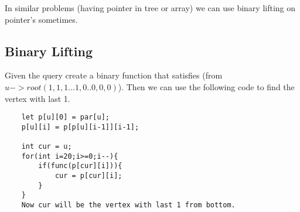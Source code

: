 \documentclass[../Notes.tex]{subfiles}
\begin{document}
In similar problems (having pointer in tree or array) we can use binary lifting on pointer's sometimes.\\

\pagebreak

\subsection{Binary Lifting}
Given the query create a binary function that satisfies (from $u -> root (1,1,1...1,0..0,0,0)$). Then we can use the following code to find the vertex with last 1.

\begin{lstlisting}
	let p[u][0] = par[u];
	p[u][i] = p[p[u][i-1]][i-1];
	
	int cur = u;
	for(int i=20;i>=0;i--){
		if(func(p[cur][i])){
			cur = p[cur][i];		
		}	
	}
	Now cur will be the vertex with last 1 from bottom.	
	   		
\end{lstlisting}
\end{document}
